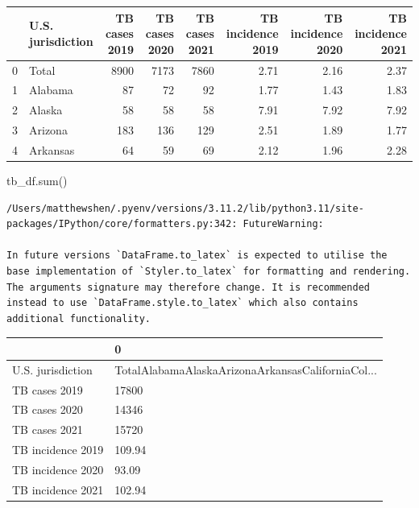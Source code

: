 \documentclass[
  letterpaper,
  DIV=11,
  numbers=noendperiod]{scrreprt}
\newenvironment{Shaded}{\begin{snugshade}}{\end{snugshade}}
\newcommand{\BuiltInTok}[1]{\textcolor[rgb]{0.00,0.23,0.31}{#1}}
\newcommand{\NormalTok}[1]{\textcolor[rgb]{0.00,0.23,0.31}{#1}}
\begin{document}
\begin{tabular}{llrrrrrr}
\toprule
{} & U.S. jurisdiction &  TB cases 2019 &  TB cases 2020 &  TB cases 2021 &  TB incidence 2019 &  TB incidence 2020 &  TB incidence 2021 \\
\midrule
0 &             Total &           8900 &           7173 &           7860 &               2.71 &               2.16 &               2.37 \\
1 &           Alabama &             87 &             72 &             92 &               1.77 &               1.43 &               1.83 \\
2 &            Alaska &             58 &             58 &             58 &               7.91 &               7.92 &               7.92 \\
3 &           Arizona &            183 &            136 &            129 &               2.51 &               1.89 &               1.77 \\
4 &          Arkansas &             64 &             59 &             69 &               2.12 &               1.96 &               2.28 \\
\bottomrule
\end{tabular}

\begin{Shaded}
\begin{Highlighting}[]
\NormalTok{tb\_df.}\BuiltInTok{sum}\NormalTok{()}
\end{Highlighting}
\end{Shaded}

\begin{verbatim}
/Users/matthewshen/.pyenv/versions/3.11.2/lib/python3.11/site-packages/IPython/core/formatters.py:342: FutureWarning:

In future versions `DataFrame.to_latex` is expected to utilise the base implementation of `Styler.to_latex` for formatting and rendering. The arguments signature may therefore change. It is recommended instead to use `DataFrame.style.to_latex` which also contains additional functionality.
\end{verbatim}

\begin{tabular}{ll}
\toprule
{} &                                                  0 \\
\midrule
U.S. jurisdiction &  TotalAlabamaAlaskaArizonaArkansasCaliforniaCol... \\
TB cases 2019     &                                              17800 \\
TB cases 2020     &                                              14346 \\
TB cases 2021     &                                              15720 \\
TB incidence 2019 &                                             109.94 \\
TB incidence 2020 &                                              93.09 \\
TB incidence 2021 &                                             102.94 \\
\bottomrule
\end{tabular}
\end{document}
